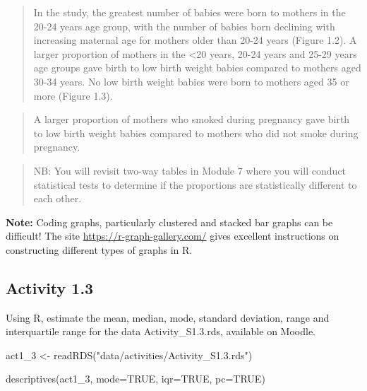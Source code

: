 \documentclass[
]{memoir}
\newenvironment{Shaded}{\begin{snugshade}}{\end{snugshade}}
\newcommand{\AttributeTok}[1]{\textcolor[rgb]{0.77,0.63,0.00}{#1}}
\newcommand{\ConstantTok}[1]{\textcolor[rgb]{0.00,0.00,0.00}{#1}}
\newcommand{\FunctionTok}[1]{\textcolor[rgb]{0.00,0.00,0.00}{#1}}
\newcommand{\NormalTok}[1]{#1}
\newcommand{\OtherTok}[1]{\textcolor[rgb]{0.56,0.35,0.01}{#1}}
\newcommand{\StringTok}[1]{\textcolor[rgb]{0.31,0.60,0.02}{#1}}
\begin{document}
\begin{quote}
In the study, the greatest number of babies were born to mothers in the 20-24 years age group, with the number of babies born declining with increasing maternal age for mothers older than 20-24 years (Figure 1.2). A larger proportion of mothers in the \textless20 years, 20-24 years and 25-29 years age groups gave birth to low birth weight babies compared to mothers aged 30-34 years. No low birth weight babies were born to mothers aged 35 or more (Figure 1.3).
\end{quote}

\begin{quote}
A larger proportion of mothers who smoked during pregnancy gave birth to low birth weight babies compared to mothers who did not smoke during pregnancy.
\end{quote}

\begin{quote}
NB: You will revisit two-way tables in Module 7 where you will conduct statistical tests to determine if the proportions are statistically different to each other.
\end{quote}

\textbf{Note: } Coding graphs, particularly clustered and stacked bar graphs can be difficult! The site \url{https://r-graph-gallery.com/} gives excellent instructions on constructing different types of graphs in R.

\hypertarget{activity-1.3}{%
\subsection*{Activity 1.3}\label{activity-1.3}}

Using R, estimate the mean, median, mode, standard deviation, range and interquartile range for the data Activity\_S1.3.rds, available on Moodle.

\begin{Shaded}
\begin{Highlighting}[]
\NormalTok{act1\_3 }\OtherTok{\textless{}{-}} \FunctionTok{readRDS}\NormalTok{(}\StringTok{"data/activities/Activity\_S1.3.rds"}\NormalTok{)}

\FunctionTok{descriptives}\NormalTok{(act1\_3, }\AttributeTok{mode=}\ConstantTok{TRUE}\NormalTok{, }\AttributeTok{iqr=}\ConstantTok{TRUE}\NormalTok{, }\AttributeTok{pc=}\ConstantTok{TRUE}\NormalTok{)}
\end{Highlighting}
\end{Shaded}
\end{document}
